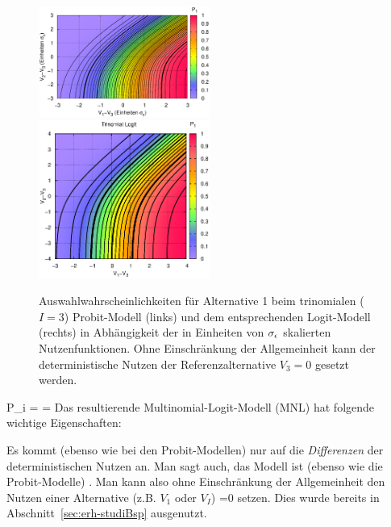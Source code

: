 \begin{figure}
 \includegraphics[width=0.5\textwidth]{./figsDiscr/p1ProbitTrinom_V1V2.eps}   
 \includegraphics[width=0.5\textwidth]{./figsDiscr/pLogitTrinom_V1V2.eps}   
  \caption{\label{fig:pTrinom}Auswahlwahrscheinlichkeiten f\"ur
Alternative 1 beim trinomialen ($I=3$) Probit-Modell (links) und dem
entsprechenden Logit-Modell (rechts) in
Abh\"angigkeit der in Einheiten von $\sigma_{\epsilon}$ skalierten Nutzenfunktionen. Ohne
Einschr\"ankung der Allgemeinheit kann der deterministische Nutzen
der Referenzalternative $V_3=0$ gesetzt werden.
}
\end{figure}
%
\be
\label{MNLunscaled}
P_i =
=
\ee
Das resultierende Multinomial-Logit-Modell (MNL)  hat folgende
wichtige Eigenschaften:
\bi
\item Es kommt (ebenso wie bei den
Probit-Modellen) nur auf die \textit{Differenzen} der deterministischen
Nutzen an. Man sagt auch, das Modell ist (ebenso wie die
Probit-Modelle) . Man kann also ohne
Einschr\"ankung der Allgemeinheit den Nutzen einer Alternative (z.B.
$V_1$ oder $V_I$) =0 setzen. Dies wurde bereits in
Abschnitt~\ref{sec:erh-studiBsp} ausgenutzt.

